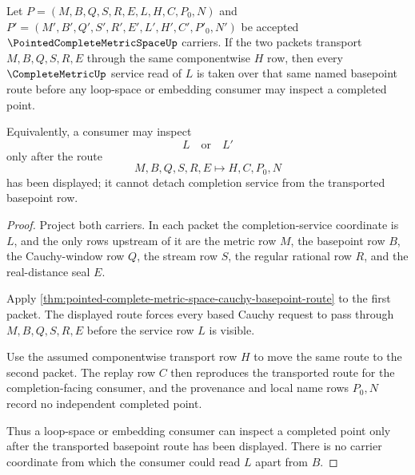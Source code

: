 \begin{theorem}
\label{thm:pointed-complete-metric-basepoint-completion-handoff}
Let $P=(M,B,Q,S,R,E,L,H,C,P_0,N)$ and
$P'=(M',B',Q',S',R',E',L',H',C',P'_0,N')$ be accepted
$\PointedCompleteMetricSpaceUp$ carriers. If the two packets transport
$M,B,Q,S,R,E$ through the same componentwise $H$ row, then every
$\CompleteMetricUp$ service read of $L$ is taken over that same named
basepoint route before any loop-space or embedding consumer may inspect a
completed point.

Equivalently, a consumer may inspect
$$
L \quad\text{or}\quad L'
$$
only after the route
$$
M,B,Q,S,R,E \longmapsto H,C,P_0,N
$$
has been displayed; it cannot detach completion service from the transported
basepoint row.
\end{theorem}
\begin{proof}
Project both carriers. In each packet the completion-service coordinate is
$L$, and the only rows upstream of it are the metric row $M$, the basepoint row
$B$, the Cauchy-window row $Q$, the stream row $S$, the regular rational row
$R$, and the real-distance seal $E$.

Apply \autoref{thm:pointed-complete-metric-space-cauchy-basepoint-route} to
the first packet. The displayed route forces every based Cauchy request to
pass through $M,B,Q,S,R,E$ before the service row $L$ is visible.

Use the assumed componentwise transport row $H$ to move the same route to the
second packet. The replay row $C$ then reproduces the transported route for
the completion-facing consumer, and the provenance and local name rows
$P_0,N$ record no independent completed point.

Thus a loop-space or embedding consumer can inspect a completed point only
after the transported basepoint route has been displayed. There is no carrier
coordinate from which the consumer could read $L$ apart from $B$.
\end{proof}

